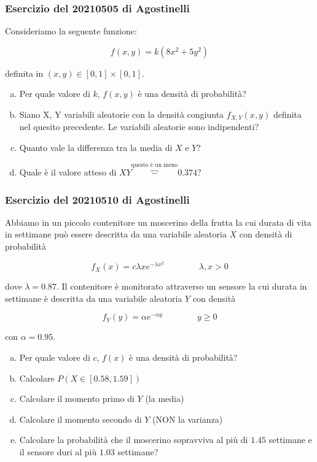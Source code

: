 \documentclass{beamer}
\date[04/05/2022]{4 maggio 2022}
\begin{document}
\frame{\titlepage}

\begin{frame}
	\frametitle{Esercizio del 20210505 di Agostinelli}
	\begin{exercise}[20210505]
		Consideriamo la seguente funzione:

		\[
			f(x, y) = k ( 8x^2 + 5y^2)
		\]

		definita in $(x, y) \in [0, 1] \times [0,1]$.

		\begin{enumerate}[(a)]
			\item Per quale valore di $k$, $f(x, y)$ è una densità di probabilità?
			\item Siano X, Y variabili aleatorie con la densità congiunta $f_{X, Y}(x, y)$ definita nel quesito precedente. Le variabili aleatorie sono indipendenti?
			\item Quanto vale la differenza tra la media di $X$ e $Y$?
			\item Quale è il valore atteso di $XY \overbrace{-}^{\text{questo è un meno}} 0.374$?
		\end{enumerate}
	\end{exercise}
\end{frame}

\begin{frame}
	\frametitle{Esercizio del 20210510 di Agostinelli}
	\begin{exercise}[20210510]

		Abbiamo in un piccolo contenitore un moscerino della frutta la cui durata di vita in settimane può essere descritta da una variabile aleatoria $X$ con densità di probabilità

		\[ 
			f_X(x) = c \lambda x e^{-\lambda x^2} \qquad \qquad \lambda, x > 0
		\]
		
		dove $\lambda = 0.87$. Il contenitore è monitorato attraverso un sensore la cui durata in settimane è descritta da una variabile aleatoria $Y$ con densità

		\[
			f_Y(y) = \alpha e^{-\alpha y} \qquad \qquad y \ge 0
		\]

		con $\alpha = 0.95$.
	\end{exercise}
\end{frame}
\begin{frame}
	\begin{exercise}[20210510]
		\begin{enumerate}[(a)]
			\item Per quale valore di $c$, $f(x)$ è una densità di probabilità?
			\item Calcolare $P(X \in [0.58, 1.59])$
			\item Calcolare il momento primo di $Y$ (la media)
			\item Calcolare il momento secondo di $Y$ (NON la varianza)
			\item Calcolare la probabilità che il moscerino sopravviva al più di $1.45$ settimane e il sensore duri al più $1.03$ settimane?
		\end{enumerate}
	\end{exercise}
\end{frame}
\end{document}
